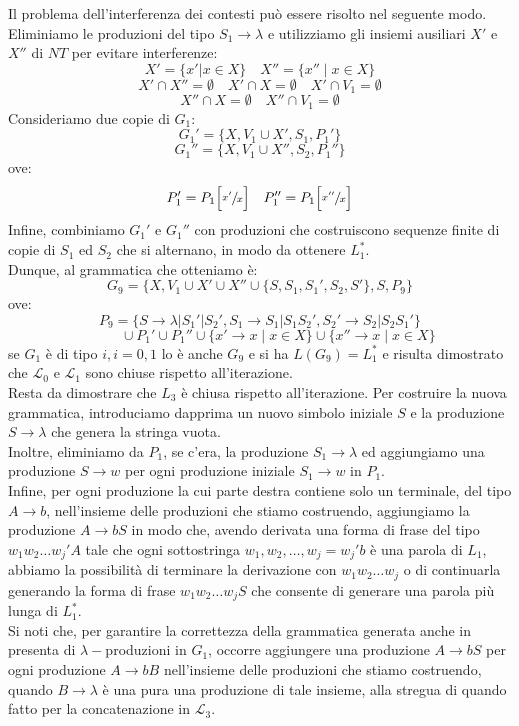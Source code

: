 \documentclass[12pt]{report}
\begin{document}
{{{\begin{enumerate}
 			Il problema dell'interferenza dei contesti può essere risolto nel seguente modo. Eliminiamo le produzioni del tipo $S_1 \to \lambda$ e utilizziamo gli insiemi ausiliari $X'$ e $X''$ di $NT$ per evitare interferenze:
 			\[
 			X' = \{x' | x \in X\} \quad X''=\{x'' \mid x \in X\}
 			\]
 			\[
 			X'\cap X'' = \emptyset \quad X'\cap X = \emptyset \quad X' \cap V_1 = \emptyset
 			\]
 			\[
 			X'' \cap X = \emptyset \quad X'' \cap V_1 = \emptyset
 			\]
 			Consideriamo due copie di $G_1$:
 			\[
 			G_1'=\{X, V_1 \cup X', S_1, P_1'\}
 			\]
 			\[
 			G_1''=\{X, V_1 \cup X'', S_2, P_1''\}
 			\]
 			ove:
 			\[ P_1' = P_1\Big[\sfrac{x'}{x} \Big] \quad  P_1''= P_1\Big[\sfrac{x''}{x} \Big]\]
 			Infine, combiniamo $G_1'$ e $G_1''$ con produzioni che costruiscono sequenze finite di copie di $S_1$ ed $S_2$ che si alternano, in modo da ottenere $L_1^*$. \\
 			Dunque, al grammatica che otteniamo è:
 			\[
 			G_9 = \{X, V_1 \cup X' \cup X'' \cup \{S,S_1, S_1', S_2, S'\}, S, P_9\}
 			\]
 			ove:
 			\[
 			P_9 = \{S \to \lambda|S_1'|S_2', S_1 \to S_1 | S_1S_2', S_2' \to S_2|S_2S_1'\}
 			\]
 			\[
 			\phantom{P_9 =\ }
 			\cup P_1' \cup P_1'' \cup \{x' \to x\mid x\in X\} \cup \{x'' \to x \mid x\in X\}
 			\]
 			se $G_1$ è di tipo $i, i = 0,1$ lo è anche $G_9$ e si ha $L(G_9) = L_1^*$ e risulta dimostrato che $\mathcal{L}_0$ e $\mathcal{L}_1$ sono chiuse rispetto all'iterazione. \\
 			Resta da dimostrare che $L_3$ è chiusa rispetto all'iterazione. Per costruire la nuova grammatica, introduciamo dapprima un nuovo simbolo iniziale $S$ e la produzione $S \to \lambda$ che genera la stringa vuota. \\
 			Inoltre, eliminiamo da $P_1$, se c'era, la produzione $S_1 \to \lambda$ ed aggiungiamo una produzione $S \to w$ per ogni produzione iniziale $S_1 \to w$ in $P_1$. \\
 			Infine, per ogni produzione la cui parte destra contiene solo un terminale, del tipo $A \to b$, nell'insieme delle produzioni che stiamo costruendo, aggiungiamo la produzione $A \to bS$ in modo che, avendo derivata una forma di frase del tipo $w_1w_2\dots w_j'A$ tale che ogni sottostringa $w_1, w_2, \dots, w_j = w_j'b$ è una parola di $L_1$, abbiamo la possibilità di terminare la derivazione con $w_1w_2\dots w_j$ o di continuarla generando la forma di frase $w_1w_2 \dots w_jS$ che consente di generare una parola più lunga di $L_1^*$. \\
 			Si noti che, per garantire la correttezza della grammatica generata anche in presenta di $\lambda-$produzioni in $G_1$, occorre aggiungere una produzione $A \to bS$ per ogni produzione $A \to bB$ nell'insieme delle produzioni che stiamo costruendo, quando $B \to \lambda$ è una pura una produzione di tale insieme, alla stregua di quando fatto per la concatenazione in $\mathcal{L}_3$. \\

\end{enumerate}}}}
\end{document}
